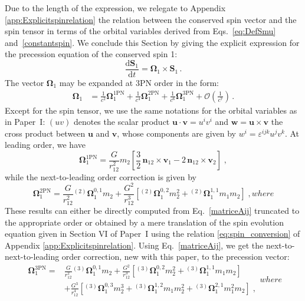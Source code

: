 \documentclass[
superscriptaddress,
preprint,
prd,tightenlines,showpacs,nofootinbib,
eqsecnum,
amsfonts,amsmath,amssymb]{revtex4-1}
\newcommand{\ud}{\mathrm{d}}
\begin{document}
Due to the length of the expression, we relegate to Appendix
\ref{app:Explicitspinrelation} the relation between the conserved spin
vector and the spin tensor in terms of the orbital variables derived
from Eqs.~\eqref{eq:DefSmu} and~\eqref{constantspin}. We conclude this
Section by giving the explicit expression for the precession equation
of the conserved spin 1:
%
\begin{equation}
\frac{\ud \mathbf{S}_1}{\ud t}=\mathbf{\Omega}_1 \times \mathbf{S}_1 \,.
\end{equation}
%
The vector $\mathbf{\Omega}_1$ may be expanded at 3PN order in the form:
%
\begin{align}
\label{Omegastruct}
\mathbf{\Omega}_1 &=
\frac{1}{c^2}\mathbf{\Omega}_1^\mathrm{1PN}
+\frac{1}{c^4}\mathbf{\Omega}_1^\mathrm{2PN}
+\frac{1}{c^6}\mathbf{\Omega}_1^\mathrm{3PN}
+ \mathcal{O}\left(\frac{1}{c^7}\right) \,.
\end{align}
%
Except for the spin tensor, we use the same notations for the orbital
variables as in Paper~I: $(uv)$ denotes the scalar product
$\mathbf{u}\cdot\mathbf{v}=u^i v^i$ and
$\mathbf{w}=\mathbf{u}\times\mathbf{v}$ the cross product between $\mathbf{u}$
and $\mathbf{v}$, whose components are given by $w^i=\varepsilon^{ijk}u^jv^k$.
At leading order, we have
%
\begin{equation}
	\mathbf{\Omega}_1^\mathrm{1PN}= \frac{G}{r_{12}^{2}} m_{2}\left[
	 \frac{3}{2} \, \mathbf{ n}_{12} \times \mathbf{v}_{1}   - 
2 \, \mathbf{ n}_{12} \times \mathbf{v}_{2} \right] \;,
\end{equation}
%
while the next-to-leading order correction is given by
\begin{subequations}
\begin{equation}
	\mathbf{\Omega}_1^\mathrm{2PN}= 
	\frac{G}{r_{12}^{2}}  {}^{(2)}\mathbf{\Omega}^{0,1}_1 m_{2} 
	+ \frac{G^{2}}{r_{12}^{3}} 
\left[ {}^{(2)}\mathbf{\Omega}^{0,2}_1 m_{2}^{2} + 
{}^{(2)}\mathbf{\Omega}^{1,1}_1 m_{1}m_{2} \right]  \;,
\end{equation}
%
where 
%

\end{subequations}\noindent
%
These results can either be directly computed from
Eq.~\eqref{matriceAij} truncated to the appropriate order or obtained
by a mere translation of the spin evolution equation given in Section
VI of Paper~I using the relation \eqref{eq:spin_conversion} of
Appendix \ref{app:Explicitspinrelation}. Using Eq.~\eqref{matriceAij},
we get the next-to-next-to-leading order correction, new with
this paper, to the precession vector:
%
\begin{subequations}
\begin{align}
	\mathbf{\Omega}_1^\mathrm{3PN}=& 
	\frac{G}{r_{12}^{2}} {}^{(3)}\mathbf{\Omega}^{0,1}_1 m_{2} 
	+ \frac{G^{2}}{r_{12}^{3}} 
\left[ {}^{(3)}\mathbf{\Omega}^{0,2}_1 m_{2}^{2} + 
{}^{(3)}\mathbf{\Omega}^{1,1}_1 m_{1}m_{2} \right]  \nonumber \\
	&  + \frac{G^{3}}{r_{12}^{4}} 
\left[ {}^{(3)}\mathbf{\Omega}^{0,3}_1 m_{2}^{3} + 
{}^{(3)}\mathbf{\Omega}^{1,2}_1 m_{1}m_{2}^{2}  + 
{}^{(3)}\mathbf{\Omega}^{2,1}_1 m_{1}^{2}m_{2} \right] \;,
\end{align}
%
where
%

\end{subequations}
\end{document}
